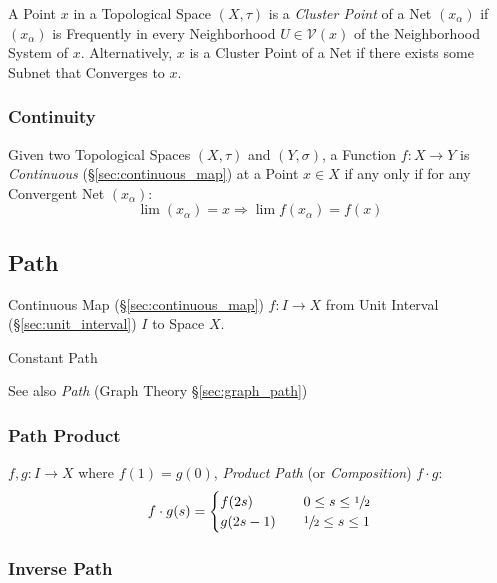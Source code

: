 A Point $x$ in a Topological Space $(X,\tau)$ is a \emph{Cluster
  Point} of a Net $(x_\alpha)$ if $(x_\alpha)$ is Frequently in every
Neighborhood $U \in \mathcal{V}(x)$ of the Neighborhood System of $x$.
Alternatively, $x$ is a Cluster Point of a Net if there exists some
Subnet that Converges to $x$.



\subsubsection{Continuity}\label{sec:net_continuity}

Given two Topological Spaces $(X,\tau)$ and $(Y,\sigma)$, a Function
$f : X \rightarrow Y$ is \emph{Continuous}
(\S\ref{sec:continuous_map}) at a Point $x \in X$ if any only if for
any Convergent Net $(x_\alpha)$:
\[
  \lim (x_\alpha) = x \Rightarrow \lim f(x_\alpha) = f(x)
\]



\subsection{Path}\label{sec:path} \cite{hatcher02}

Continuous Map (\S\ref{sec:continuous_map}) $f : I \rightarrow X$ from
Unit Interval (\S\ref{sec:unit_interval}) $I$ to Space $X$.

Constant Path %

\fist See also \emph{Path} (Graph Theory \S\ref{sec:graph_path})



\subsubsection{Path Product}\label{sec:path_product}

$f,g : I \rightarrow X$ where $f(1) = g(0)$, \emph{Product Path} (or
\emph{Composition}) $f \cdot g$:
\[
  f \cdot g (s) =
  \begin{cases}
    f(2s)   & \quad 0 \leq s \leq \sfrac{1}{2} \\
    g(2s-1) & \quad \sfrac{1}{2} \leq s \leq 1 \\
  \end{cases}
\]



\subsubsection{Inverse Path}\label{sec:inverse_path}

